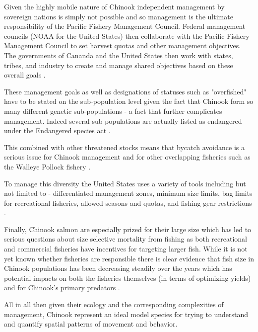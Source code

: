 \documentclass[11pt]{article}
\begin{document}
Given the highly mobile nature of Chinook independent management by sovereign nations is simply not possible and so management is the ultimate responsibility of the Pacific Fishery Management Council. Federal management councils (NOAA for the United States) then collaborate with the Pacific Fishery Management Council to set harvest quotas and other management objectives. The governments of Cananda and the United States then work with states, tribes, and industry to create and manage shared objectives based on these overall goals \cite{NOAA22}. 

These management goals as well as designations of statuses such as "overfished" have to be stated on the sub-population level given the fact that Chinook form so many different genetic sub-populations \cite{salmonplan} - a fact that further complicates management. Indeed several sub populations are actually listed as endangered under the Endangered species act \cite{NOAA24}.

This combined with other threatened stocks \cite{NOAA24} means that bycatch avoidance is a serious issue for Chinook management and for other overlapping fisheries such as the Walleye Pollock fishery \cite{ianelli2015}. 

To manage this diversity the United States uses a variety of tools including but not limited to - differentiated management zones, minimum size limits, bag limits for recreational fisheries, allowed seasons and quotas, and fishing gear restrictions \cite{salmonplan}. \newline

Finally, Chinook salmon are especially prized for their large size which has led to serious questions about size selective mortality from fishing as both recreational and commercial fisheries have incentives for targeting larger fish. While it is not yet known whether fisheries are responsible there is clear evidence that fish size in Chinook populations has been decreasing steadily over the years which has potential impacts on both the fisheries themselves (in terms of optimizing yields) and for Chinook's primary predators \cite{kendall2011}\cite{oceanchinook}. \newline


All in all then given their ecology and the corresponding complexities of management, Chinook represent an ideal model species for trying to understand and quantify spatial patterns of movement and behavior. 
\end{document}
